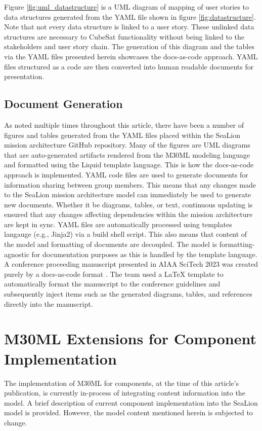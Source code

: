 \documentclass[journal,article,submit,pdftex,moreauthors]{Definitions/mdpi}
\begin{document}
Figure \ref{fig:uml_datastructure} is a UML diagram of mapping of user stories to data structures generated from the YAML file shown in figure \ref{fig:datastructure}.  Note that not every data structure is linked to a user story.  These unlinked data structures are necessary to CubeSat functionality without being linked to the stakeholders and user story chain.  The generation of this diagram and the tables via the YAML files presented herein showcases the docs-as-code approach.  YAML files structured as a code are then converted into human readable documents for presentation.

\subsection{Document Generation}
As noted multiple times throughout this article, there have been a number of figures and tables generated from the YAML files placed within the SeaLion mission architecture GitHub repository.  Many of the figures are UML diagrams that are auto-generated artifacts rendered from the M30ML modeling language and formatted using the Liquid template language.  This is how the docs-as-code approach is implemented.  YAML code files are used to generate documents for information sharing between group members.  This means that any changes made to the SeaLion mission architecture model can immediately be used to generate new documents.  Whether it be diagrams, tables, or text, continuous updating is ensured that any changes affecting dependencies within the mission architecture are kept in sync.  YAML files are automatically processed using templates langauge (e.g., Jinja2) via a build shell script.  This also means that content of the model and formatting of documents are decoupled.  The model is formatting-agnostic for documentation purposes as this is handled by the template language.  A conference proceeding manuscript presented in AIAA SciTech 2023 was created purely by a docs-as-code format \cite{scitech_proceeding}.  The team used a LaTeX template to automatically format the manuscript to the conference guidelines and subsequently inject items such as the generated diagrams, tables, and references directly into the manuscript.

\section{M30ML Extensions for Component Implementation}
The implementation of M30ML for components, at the time of this article's publication, is currently in-process of integrating content information into the model.  A brief description of current component implementation into the SeaLion model is provided.  However, the model content mentioned herein is subjected to change.
\end{document}
